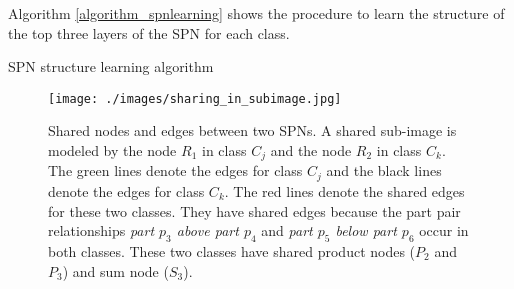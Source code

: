 \documentclass[journal]{IEEEtran}
\begin{document}
Algorithm \ref{algorithm_spnlearning} shows the procedure to learn the structure of the top three layers of the SPN for each class.



\begin{algorithm}[h]
	\caption{SPN structure learning algorithm}
	\label{algorithm_spnlearning}
\end{algorithm}




\begin{figure}[htb]
	\begin{center}
		\texttt{[image: ./images/sharing\_in\_subimage.jpg]}
	\end{center}
	\caption{Shared nodes and edges between two SPNs. A shared sub-image is modeled by the node $ R_1 $ in class $ C_j $ and the node $ R_2 $ in class $ C_k $. The green lines denote the edges for class $ C_j $ and the black lines denote the edges for class $ C_k $. The red lines denote the shared edges for these two classes. They have shared edges because the part pair relationships \textit{part $ p_3 $ above part $ p_4 $} and \textit{part $ p_5 $ below part $ p_6 $} occur in both classes. These two classes have shared product nodes ($ P_2 $ and $ P_3 $) and sum node ($ S_3 $).}
	\label{fig:sharing_in_subimage}
\end{figure}
\end{document}

